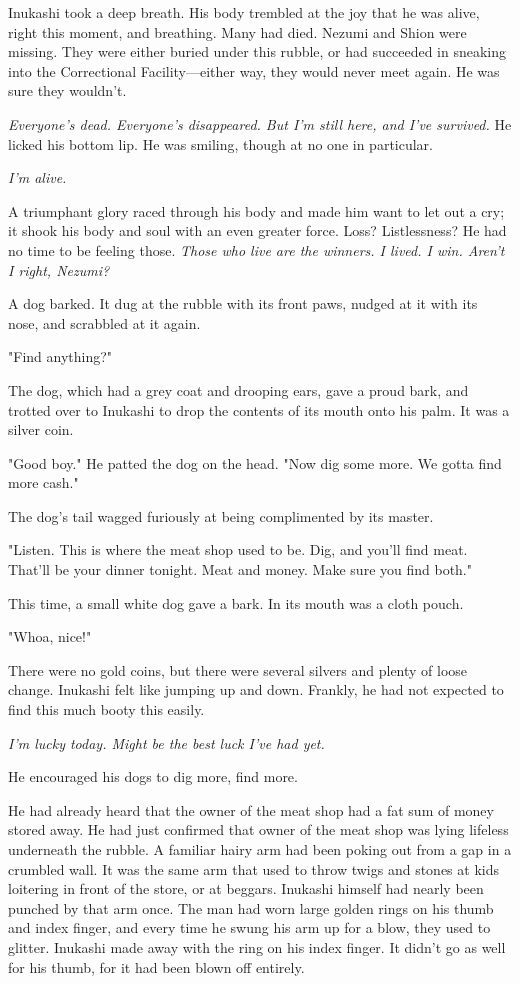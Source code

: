 Inukashi took a deep breath. His body trembled at the joy that he was
alive, right this moment, and breathing. Many had died. Nezumi and Shion
were missing. They were either buried under this rubble, or had
succeeded in sneaking into the Correctional Facility---either way, they
would never meet again. He was sure they wouldn't.

\emph{Everyone's dead. Everyone's disappeared. But I'm still here, and I've
survived.} He licked his bottom lip. He was smiling, though at no one in
particular.

\emph{I'm alive.}

A triumphant glory raced through his body and made him want to let out a
cry; it shook his body and soul with an even greater force. Loss?
Listlessness? He had no time to be feeling those. \emph{Those who live are the
winners. I lived. I win. Aren't I right, Nezumi?}

A dog barked. It dug at the rubble with its front paws, nudged at it
with its nose, and scrabbled at it again.

"Find anything?"

The dog, which had a grey coat and drooping ears, gave a proud bark, and
trotted over to Inukashi to drop the contents of its mouth onto his
palm. It was a silver coin.

"Good boy." He patted the dog on the head. "Now dig some more. We gotta
find more cash."

The dog's tail wagged furiously at being complimented by its master.

"Listen. This is where the meat shop used to be. Dig, and you'll find
meat. That'll be your dinner tonight. Meat and money. Make sure you find
both."

This time, a small white dog gave a bark. In its mouth was a cloth
pouch.

"Whoa, nice!"

There were no gold coins, but there were several silvers and plenty of
loose change. Inukashi felt like jumping up and down. Frankly, he had
not expected to find this much booty this easily.

\emph{I'm lucky today. Might be the best luck I've had yet.}

He encouraged his dogs to dig more, find more.

He had already heard that the owner of the meat shop had a fat sum of
money stored away. He had just confirmed that owner of the meat shop was
lying lifeless underneath the rubble. A familiar hairy arm had been
poking out from a gap in a crumbled wall. It was the same arm that used
to throw twigs and stones at kids loitering in front of the store, or at
beggars. Inukashi himself had nearly been punched by that arm once. The
man had worn large golden rings on his thumb and index finger, and every
time he swung his arm up for a blow, they used to glitter. Inukashi made
away with the ring on his index finger. It didn't go as well for his
thumb, for it had been blown off entirely.

